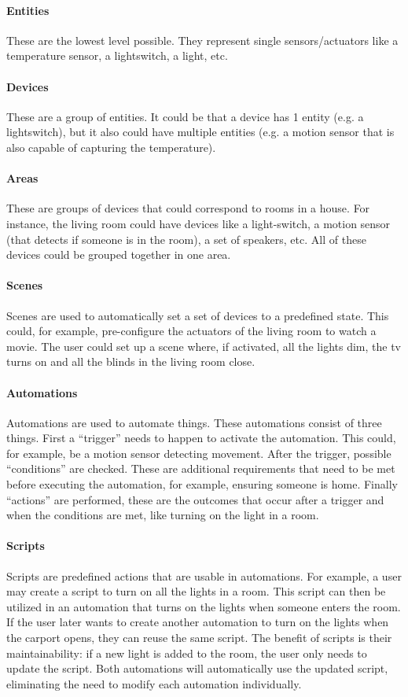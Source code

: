\documentclass[11pt,a4paper]{report}
\begin{document}
\paragraph{Entities}
These are the lowest level possible. They represent single sensors/actuators like a temperature sensor, a lightswitch, a light, etc.
\paragraph{Devices}
These are a group of entities. It could be that a device has 1 entity (e.g. a lightswitch), but it also could have multiple entities (e.g. a motion sensor that is also capable of capturing the temperature).
\paragraph{Areas}
These are groups of devices that could correspond to rooms in a house. For instance, the living room could have devices like a light-switch, a motion sensor (that detects if someone is in the room), a set of speakers, etc. All of these devices could be grouped together in one area.
\paragraph{Scenes}
Scenes are used to automatically set a set of devices to a predefined state. This could, for example, pre-configure the actuators of the living room to watch a movie. The user could set up a scene where, if activated, all the lights dim, the tv turns on and all the blinds in the living room close. 
\paragraph{Automations}
Automations are used to automate things. These automations consist of three things.
First a ``trigger'' needs to happen to activate the automation. This could, for example, be a motion sensor detecting movement. After the trigger, possible ``conditions'' are checked. These are additional requirements that need to be met before executing the automation, for example, ensuring someone is home. Finally ``actions'' are performed, these are the outcomes that occur after a trigger and when the conditions are met, like turning on the light in a room.
\paragraph{Scripts}
Scripts are predefined actions that are usable in automations. For example, a user may create a script to turn on all the lights in a room. This script can then be utilized in an automation that turns on the lights when someone enters the room. If the user later wants to create another automation to turn on the lights when the carport opens, they can reuse the same script. The benefit of scripts is their maintainability: if a new light is added to the room, the user only needs to update the script. Both automations will automatically use the updated script, eliminating the need to modify each automation individually.
\end{document}
